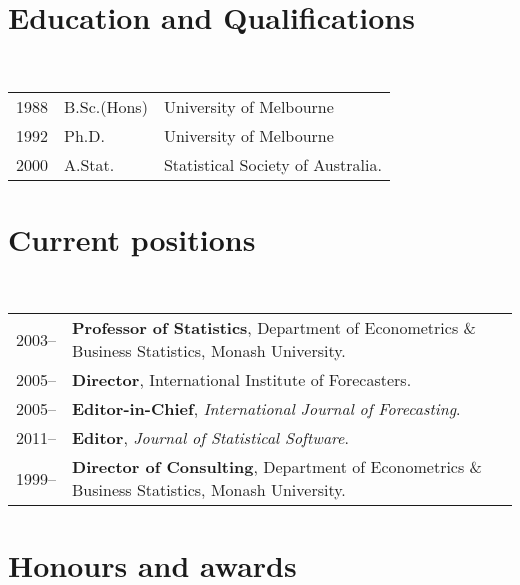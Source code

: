 \documentclass[a4paper,10pt]{article}
\begin{document}
\maketitle

\section{Education and Qualifications}

~\begin{tabular}{lll}
1988 & B.Sc.(Hons) & University of Melbourne\\
1992 & Ph.D. & University of Melbourne\\
2000 & A.Stat. & Statistical Society of Australia.
\end{tabular}


\section{Current positions}

~\begin{tabular}{lP{15cm}}
2003--& \textbf{Professor of Statistics},
        Department of Econometrics \& Business Statistics, Monash University.\\
2005--& \textbf{Director},
        International Institute of Forecasters.\\
2005--& \textbf{Editor-in-Chief},
        \textit{International Journal of Forecasting}.\\
2011--& \textbf{Editor}, \textit{Journal of Statistical Software}.\\
1999--& \textbf{Director of Consulting},
        Department of Econometrics \& Business Statistics, Monash University.
\end{tabular}



\section{Honours and awards}
\end{document}
